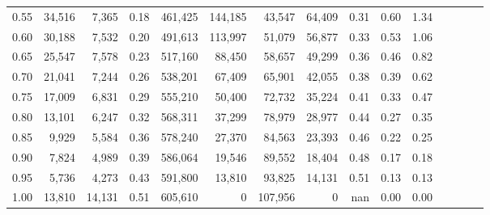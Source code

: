 \begin{tabular}{rrrcrrrrrrrrrrr}
0.55 &  34,516 &   7,365 &                                       0.18 &  461,425 &  144,185 &   43,547 &   64,409 &  0.31 &  0.60 &                         1.34 \\
0.60 &  30,188 &   7,532 &                                       0.20 &  491,613 &  113,997 &   51,079 &   56,877 &  0.33 &  0.53 &                         1.06 \\
0.65 &  25,547 &   7,578 &                                       0.23 &  517,160 &   88,450 &   58,657 &   49,299 &  0.36 &  0.46 &                         0.82 \\
0.70 &  21,041 &   7,244 &                                       0.26 &  538,201 &   67,409 &   65,901 &   42,055 &  0.38 &  0.39 &                         0.62 \\
0.75 &  17,009 &   6,831 &                                       0.29 &  555,210 &   50,400 &   72,732 &   35,224 &  0.41 &  0.33 &                         0.47 \\
0.80 &  13,101 &   6,247 &                                       0.32 &  568,311 &   37,299 &   78,979 &   28,977 &  0.44 &  0.27 &                         0.35 \\
0.85 &   9,929 &   5,584 &                                       0.36 &  578,240 &   27,370 &   84,563 &   23,393 &  0.46 &  0.22 &                         0.25 \\
0.90 &   7,824 &   4,989 &                                       0.39 &  586,064 &   19,546 &   89,552 &   18,404 &  0.48 &  0.17 &                         0.18 \\
0.95 &   5,736 &   4,273 &                                       0.43 &  591,800 &   13,810 &   93,825 &   14,131 &  0.51 &  0.13 &                         0.13 \\
1.00 &  13,810 &  14,131 &                                       0.51 &  605,610 &        0 &  107,956 &        0 &   nan &  0.00 &                         0.00 \\
\bottomrule
\end{tabular}
